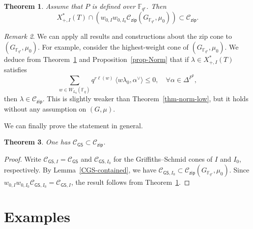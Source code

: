 \documentclass[11pt]{amsart}
\numberwithin{equation}{section}
\newtheorem{theorem}{Theorem}[section]
\theoremstyle{definition}
\theoremstyle{remark}
\newtheorem{rmk}[theorem]{Remark}
\newcommand{\zipsf}{\mathsf{zip}}
\newcommand{\GSsf}{\mathsf{GS}}
\newcommand{\Ccal}{{\mathcal C}}
\newcommand{\FF}{\mathbb{F}}
\begin{document}
\begin{theorem}\label{thm-GFqr-cone}
Assume that $P$ is defined over $\FF_{q^r}$. Then
\begin{equation}
  X_{+,I}^*(T) \cap \left(w_{0,I} w_{0,I_0} \Ccal_{\zipsf}(G_{\FF_{q^r}},\mu_0) \right) \subset \Ccal_{\zipsf}.
\end{equation}
\end{theorem}

\begin{rmk}\label{rmk-reduce-split}
    We can apply all results and constructions about the zip cone to $(G_{\FF_{q^r}},\mu_0)$.  For example, consider the highest-weight cone of $(G_{\FF_{q^r}},\mu_0)$. We deduce from Theorem~\ref{thm-GFqr-cone} and Proposition~\ref{prop-Norm} that if $\lambda\in X_{+,I}^*(T)$ satisfies
\begin{equation}\label{formula-norm-Weil}
\sum_{w\in W_{L_0}(\FF_{q})} q^{r\ell(w)} \ \langle w\lambda_0, \alpha^\vee \rangle\leq 0, \quad \forall \alpha \in \Delta^{P^0},
\end{equation}
then $\lambda\in \Ccal_{\zipsf}$. This is slightly weaker than Theorem~\ref{thm-norm-low}, but it holds without any assumption on $(G,\mu)$. 
\end{rmk}

We can finally prove the statement in general.

\begin{theorem}\label{thmGSzip}
One has $\Ccal_{\GSsf}\subset \Ccal_{\zipsf}$.
\end{theorem}

\begin{proof}
Write $\Ccal_{\GSsf,I}=\Ccal_{\GSsf}$ and $\Ccal_{\GSsf,I_0}$ for the Griffiths--Schmid cones of $I$ and $I_0$, respectively. By Lemma~\ref{CGS-contained}, we have $\Ccal_{\GSsf,I_0}\subset \Ccal_{\zipsf}(G_{\FF_{q^r}},\mu_0)$. Since $w_{0,I} w_{0,I_0}\Ccal_{\GSsf,I_0}=\Ccal_{\GSsf,I}$, the result follows from Theorem~\ref{thm-GFqr-cone}.
\end{proof}




\section{Examples}\label{sec7}
\end{document}
